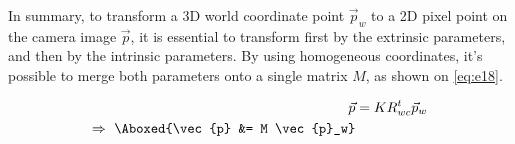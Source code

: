 \documentclass{article}
\newcounter{proofc}
\renewcommand\theproofc{(\arabic{proofc})}
\DeclareRobustCommand\stepproofc{\refstepcounter{proofc}\theproofc}
\begin{document}
In summary, to transform a 3D world coordinate point $\vec{p}_w$ to a 2D pixel point on the camera image $\vec{p}$, it is essential to transform first by the extrinsic parameters, and then by the intrinsic parameters. By using homogeneous coordinates, it's possible to merge both parameters onto a single matrix $M$, as shown on \eqref{eq:e18}.

\begin{alignat}{2}
\nonumber
\vec{p} &= KR^t_{wc} \vec{p}_w \\
\Rightarrow ~ \Aboxed{\vec{p} &= M \vec{p}_w} \label{eq:e18}
\end{alignat}















\newpage
\nocite{*}
\printbibliography



\end{document}
